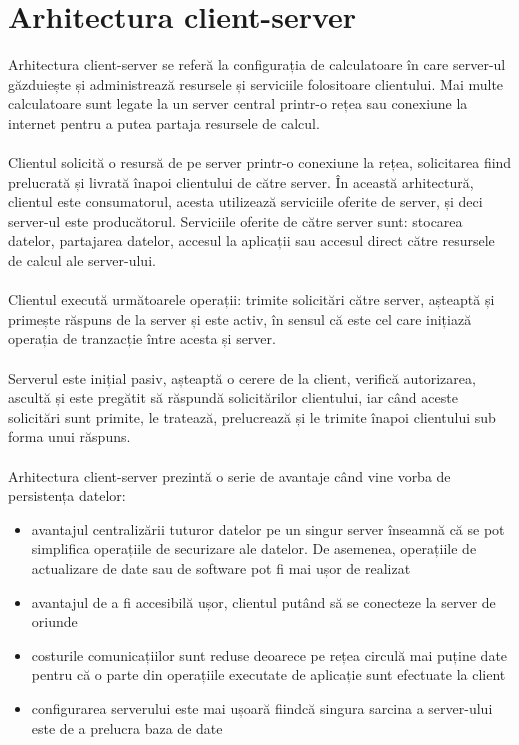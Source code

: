 
\section{Arhitectura client-server}
Arhitectura client-server se referă la configurația de calculatoare în care server-ul găzduiește și administrează resursele și serviciile folositoare clientului. Mai multe calculatoare sunt legate la un server central printr-o rețea sau conexiune la internet pentru a putea partaja resursele de calcul.\\ \\
Clientul solicită o resursă de pe server printr-o conexiune la rețea, solicitarea fiind prelucrată și livrată înapoi clientului de către server. În această arhitectură, clientul este consumatorul, acesta utilizează serviciile oferite de server, și deci server-ul este producătorul. Serviciile oferite de către server sunt: stocarea datelor, partajarea datelor, accesul la aplicații sau accesul direct către resursele de calcul ale server-ului.\\ \\
Clientul execută următoarele operații: trimite solicitări către server, așteaptă și primește răspuns de la server și este activ, în sensul că este cel care inițiază operația de tranzacție între acesta și server.
\\ \\
Serverul este inițial pasiv, așteaptă o cerere de la client, verifică autorizarea, ascultă și este pregătit să răspundă solicitărilor clientului, iar când aceste solicitări sunt primite, le tratează, prelucrează și le trimite înapoi clientului sub forma unui răspuns.
\\ \\
Arhitectura client-server prezintă o serie de avantaje când vine vorba de persistența datelor:
\begin{itemize}
	\item avantajul centralizării tuturor datelor pe un singur server înseamnă că se pot simplifica operațiile de securizare ale datelor. De asemenea, operațiile de actualizare de date sau de software pot fi mai ușor de realizat
	\item avantajul de a fi accesibilă ușor, clientul putând să se conecteze la server de oriunde
	\item costurile comunicațiilor sunt reduse deoarece pe rețea circulă mai puține date pentru că o parte din operațiile executate de aplicație sunt efectuate la client
	\item configurarea serverului este mai ușoară fiindcă singura sarcina a server-ului este de a prelucra baza de date
\end{itemize}


